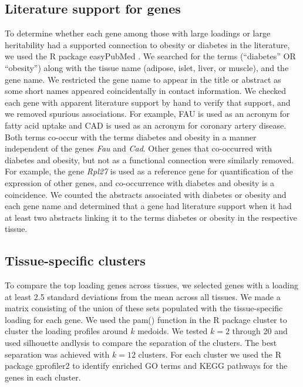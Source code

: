 \documentclass[
]{article}
\begin{document}
\subsection{Literature support for
genes}\label{literature-support-for-genes}

To determine whether each gene among those with large loadings or large
heritability had a supported connection to obesity or diabetes in the
literature, we used the R package easyPubMed \cite{easyPubMed}. We
searched for the terms (``diabetes'' OR ``obesity'') along with the
tissue name (adipose, islet, liver, or muscle), and the gene name. We
restricted the gene name to appear in the title or abstract as some
short names appeared coincidentally in contact information. We checked
each gene with apparent literature support by hand to verify that
support, and we removed spurious associations. For example, FAU is used
as an acronym for fatty acid uptake and CAD is used as an acronym for
coronary artery disease. Both terms co-occur with the terms diabetes and
obesity in a manner independent of the genes \textit{Fau} and
\textit{Cad}. Other genes that co-occurred with diabetes and obesity,
but not as a functional connection were similarly removed. For example,
the gene \textit{Rpl27} is used as a reference gene for quantification
of the expression of other genes, and co-occurrence with diabetes and
obesity is a coincidence. We counted the abstracts associated with
diabetes or obesity and each gene name and determined that a gene had
literature support when it had at least two abstracts linking it to the
terms diabetes or obesity in the respective tissue.

\subsection{Tissue-specific clusters}\label{tissue-specific-clusters}

To compare the top loading genes across tissues, we selected genes with
a loading at least 2.5 standard deviations from the mean across all
tissues. We made a matrix consisting of the union of these sets
populated with the tissue-specific loading for each gene. We used the
pam() function in the R package cluster \cite{Rcluster} to cluster the
loading profiles around \(k\) medoids. We tested \(k = 2\) through 20
and used silhouette andlysis to compare the separation of the clusters.
The best separation was achieved with \(k = 12\) clusters. For each
cluster we used the R package gprofiler2 \cite{Rgprofiler2} to identify
enriched GO terms and KEGG pathways for the genes in each cluster.
\end{document}
